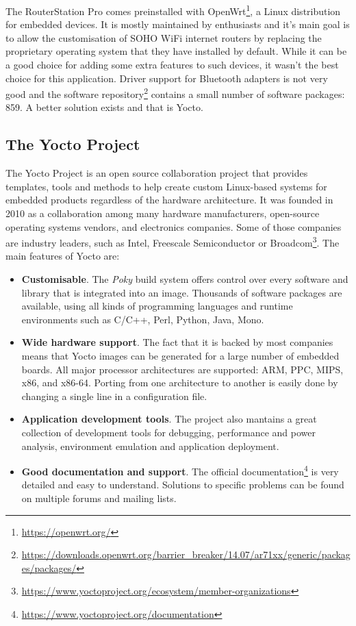 The RouterStation Pro comes preinstalled with OpenWrt\footnote{\url{https://openwrt.org/}}, a Linux distribution for embedded devices. It is mostly maintained by enthusiasts and it's main goal is to allow the customisation of SOHO WiFi internet routers by replacing the proprietary operating system that they have installed by default. While it can be a good choice for adding some extra features to such devices, it wasn't the best choice for this application. Driver support for Bluetooth adapters is not very good and the software repository\footnote{\url{https://downloads.openwrt.org/barrier_breaker/14.07/ar71xx/generic/packages/packages/}} contains a small number of software packages: 859. A better solution exists and that is Yocto.

\subsection{The Yocto Project}

The Yocto Project is an open source collaboration project that provides templates, tools and methods to help create custom Linux-based systems for embedded products regardless of the hardware architecture. It was founded in 2010 as a collaboration among many hardware manufacturers, open-source operating systems vendors, and electronics companies\cite{about-yocto}. Some of those companies are industry leaders, such as Intel, Freescale Semiconductor or Broadcom\footnote{\url{https://www.yoctoproject.org/ecosystem/member-organizations}}. The main features of Yocto are:
\begin{itemize}
\item \textbf{Customisable}. The \textit{Poky} build system offers control over every software and library that is integrated into an image. Thousands of software packages are available, using all kinds of programming languages and runtime environments such as C/C++, Perl, Python, Java, Mono.
\item \textbf{Wide hardware support}. The fact that it is backed by most companies means that Yocto images can be generated for a large number of embedded boards. All major processor architectures are supported: ARM, PPC, MIPS, x86, and x86-64. Porting from one architecture to another is easily done by changing a single line in a configuration file.
\item \textbf{Application development tools}. The project also mantains a great collection of development tools for debugging, performance and power analysis, environment emulation and application deployment.
\item \textbf{Good documentation and support}. The official documentation\footnote{\url{https://www.yoctoproject.org/documentation}} is very detailed and easy to understand. Solutions to specific problems can be found on multiple forums and mailing lists.
\end{itemize}

